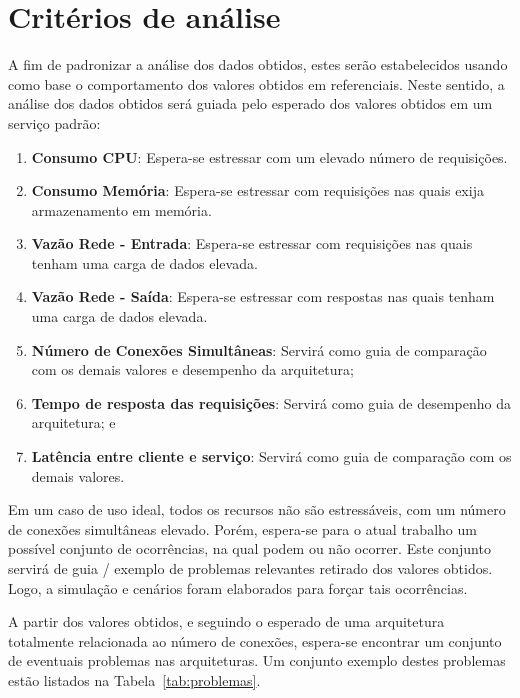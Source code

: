 \section{Critérios de análise}
\label{sec:criterios}

A fim de padronizar a análise dos dados obtidos, estes serão estabelecidos usando como base o comportamento dos valores obtidos em referenciais.
%
Neste sentido, a análise dos dados obtidos será guiada pelo esperado dos valores obtidos em um serviço padrão:

\begin{enumerate}
  \item \textbf{Consumo CPU}: Espera-se estressar com um elevado número de requisições.
  \item \textbf{Consumo Memória}: Espera-se estressar com requisições nas quais exija armazenamento em memória.
  \item \textbf{Vazão Rede - Entrada}: Espera-se estressar com requisições nas quais tenham uma carga de dados elevada.
  \item \textbf{Vazão Rede - Saída}: Espera-se estressar com respostas nas quais tenham uma carga de dados elevada.
  \item \textbf{Número de Conexões Simultâneas}: Servirá como guia de comparação com os demais valores e desempenho da arquitetura;
  \item \textbf{Tempo de resposta das requisições}: Servirá como guia de desempenho da arquitetura; e
  \item \textbf{Latência entre cliente e serviço}: Servirá como guia de comparação com os demais valores.
\end{enumerate}

Em um caso de uso ideal, todos os recursos não são estressáveis, com um número de conexões simultâneas elevado.
%
Porém, espera-se para o atual trabalho um possível conjunto de ocorrências, na qual podem ou não ocorrer.
%
Este conjunto servirá de guia / exemplo de problemas relevantes retirado dos valores obtidos.
%
Logo, a simulação e cenários foram elaborados para forçar tais ocorrências.


A partir dos valores obtidos, e seguindo o esperado de uma arquitetura totalmente relacionada ao número de conexões, espera-se encontrar um conjunto de eventuais problemas nas arquiteturas.
%
Um conjunto exemplo destes problemas estão listados na Tabela~\ref{tab:problemas}.
\pagebreak

